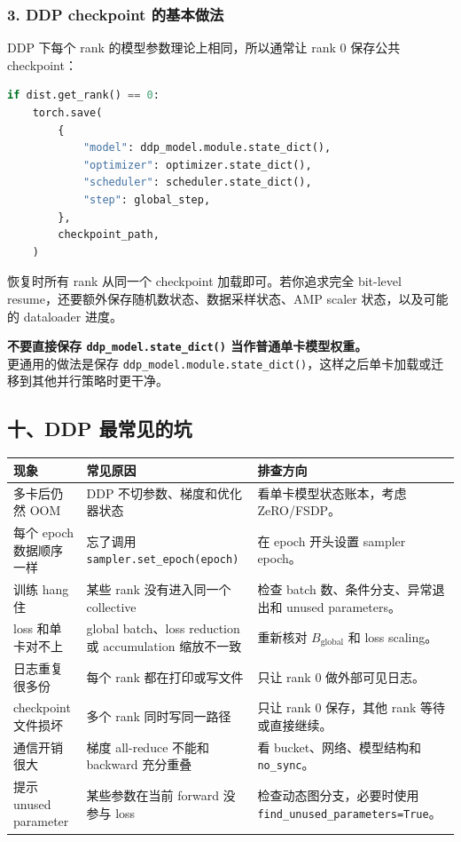 \subsubsection*{3. DDP checkpoint 的基本做法}

DDP 下每个 rank 的模型参数理论上相同，所以通常让 rank 0 保存公共 checkpoint：

\begin{lstlisting}[language=Python, caption=DDP checkpoint 的常见保存方式]
if dist.get_rank() == 0:
    torch.save(
        {
            "model": ddp_model.module.state_dict(),
            "optimizer": optimizer.state_dict(),
            "scheduler": scheduler.state_dict(),
            "step": global_step,
        },
        checkpoint_path,
    )
\end{lstlisting}

恢复时所有 rank 从同一个 checkpoint 加载即可。若你追求完全 bit-level resume，还要额外保存随机数状态、数据采样状态、AMP scaler 状态，以及可能的 dataloader 进度。

\begin{warnbox}
\textbf{不要直接保存 \texttt{ddp\_model.state\_dict()} 当作普通单卡模型权重。}\\
更通用的做法是保存 \texttt{ddp\_model.module.state\_dict()}，这样之后单卡加载或迁移到其他并行策略时更干净。
\end{warnbox}

\subsection{十、DDP 最常见的坑}

\begin{center}
{\small
\begin{tabular}{p{3.5cm}p{5.1cm}p{4.3cm}}
\hline
\textbf{现象} & \textbf{常见原因} & \textbf{排查方向} \\
\hline
多卡后仍然 OOM & DDP 不切参数、梯度和优化器状态 & 看单卡模型状态账本，考虑 ZeRO/FSDP。 \\
每个 epoch 数据顺序一样 & 忘了调用 \texttt{sampler.set\_epoch(epoch)} & 在 epoch 开头设置 sampler epoch。 \\
训练 hang 住 & 某些 rank 没有进入同一个 collective & 检查 batch 数、条件分支、异常退出和 unused parameters。 \\
loss 和单卡对不上 & global batch、loss reduction 或 accumulation 缩放不一致 & 重新核对 $B_{\text{global}}$ 和 loss scaling。 \\
日志重复很多份 & 每个 rank 都在打印或写文件 & 只让 rank 0 做外部可见日志。 \\
checkpoint 文件损坏 & 多个 rank 同时写同一路径 & 只让 rank 0 保存，其他 rank 等待或直接继续。 \\
通信开销很大 & 梯度 all-reduce 不能和 backward 充分重叠 & 看 bucket、网络、模型结构和 \texttt{no\_sync}。 \\
提示 unused parameter & 某些参数在当前 forward 没参与 loss & 检查动态图分支，必要时使用 \texttt{find\_unused\_parameters=True}。 \\
\hline
\end{tabular}
}
\end{center}

